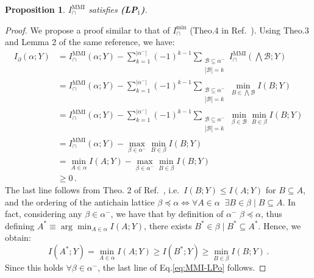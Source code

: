 \documentclass{article}
\newcommand{\ts}[1]{\ensuremath{_{\text{#1}}}}
\newcommand{\LPo}{\textbf{(LP\ts{1})}\xspace} %
\newcommand{\Imin}{\ensuremath{I_\cap^{\text{min}}}\xspace}
\newcommand{\IMMI}{\ensuremath{I_\cap^{\text{MMI}}}\xspace}
\newtheorem{proposition}{Proposition}
\begin{document}
\begin{proposition} \label{prop:MMI-LPo}
    $\IMMI$ satisfies \LPo.
\end{proposition}
\begin{proof}
    We propose a proof similar to that of $\Imin$ (Theo.4 in Ref.~\cite{williams2010nonnegative}). Using Theo.3 and Lemma 2 of the same reference,  we have:
    \begin{equation} \label{eq:MMI-LPo}
        \begin{aligned} 
            I_\partial(\alpha;Y) & = \IMMI(\alpha;Y) - \sum_{k=1}^{|\alpha^-|} (-1)^{k-1} \sum_{\substack{\mathcal{B}\subseteq\alpha^- \\ |\mathcal{B}|=k}} \IMMI(\bigwedge \mathcal{B};Y) \\
            & = \IMMI(\alpha;Y) - \sum_{k=1}^{|\alpha^-|} (-1)^{k-1} \sum_{\substack{\mathcal{B}\subseteq\alpha^- \\ |\mathcal{B}|=k}} \min_{B \in \bigwedge \mathcal{B}}I(B;Y) \\
            & = \IMMI(\alpha;Y) - \sum_{k=1}^{|\alpha^-|} (-1)^{k-1} \sum_{\substack{\mathcal{B}\subseteq\alpha^- \\ |\mathcal{B}|=k}} \min_{\beta\in\mathcal{B}}\min_{B \in \beta}I(B;Y) \\
            & = \IMMI(\alpha;Y) - \max_{\beta\in\alpha^-}\min_{B \in \beta}I(B;Y) \\
            & = \min_{A\in\alpha} I(A;Y) - \max_{\beta\in\alpha^-}\min_{B \in \beta}I(B;Y) \\
            & \geq 0 \,.
        \end{aligned}
    \end{equation}
    The last line follows from Theo. 2 of Ref.~\cite{williams2010nonnegative}, i.e.\ $I(B;Y)\leq I(A;Y)$ for $B\subseteq A$, and the ordering of the antichain lattice ${\beta\preceq\alpha \iff\forall A\in \alpha \;\;\exists B\in\beta \;|\; B\subseteq A}$. 
    In fact, considering any $\beta\in\alpha^-$, we have that by definition of $\alpha^-$ ${\beta\preceq \alpha}$, thus defining $A^*\equiv\arg\min_{A\in\alpha} I(A;Y)$, there exists $B^*\in\beta \;|\;B^*\subseteq A^*$. Hence, we obtain:
    \begin{equation}
        I(A^*;Y) = \min_{A\in\alpha} I(A;Y) \ge I(B^*;Y)\ge\min_{B \in \beta}I(B;Y) \,.
    \end{equation}
    Since this holds $\forall \beta\in\alpha^-$, the last line of Eq.\eqref{eq:MMI-LPo} follows.
\end{proof}
\end{document}
